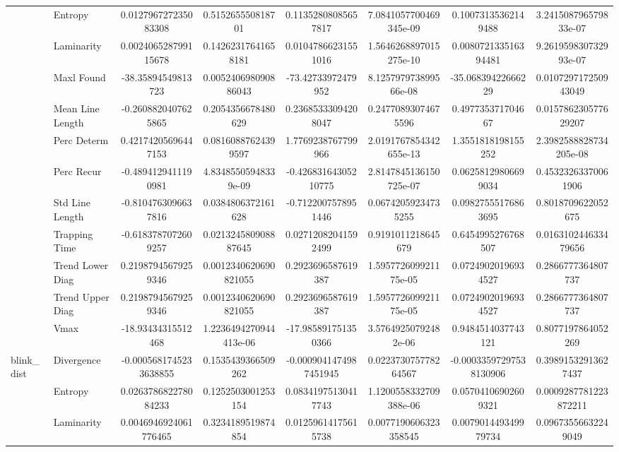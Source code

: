 \begin{tabular}{llcc|cc|cc}
 & Entropy & 0.012796727235083308 & 0.515265550818701 & 0.11352808085657817 & 7.0841057700469345e-09 & 0.10073135362149488 & 3.241508796579833e-07 \\
 & Laminarity & 0.002406528799115678 & 0.14262317641658181 & 0.01047866231551016 & 1.5646268897015275e-10 & 0.008072133516394481 & 9.261959830732993e-07 \\
 & Maxl Found & -38.35894549813723 & 0.005240698090886043 & -73.42733972479952 & 8.125797973899566e-08 & -35.06839422666229 & 0.010729717250943049 \\
 & Mean Line Length & -0.2608820407625865 & 0.2054356678480629 & 0.23685333094208047 & 0.24770893074675596 & 0.497735371704667 & 0.015786230577629207 \\
 & Perc Determ & 0.42174205696447153 & 0.08160887624399597 & 1.7769238767799966 & 2.0191767854342655e-13 & 1.3551818198155252 & 2.3982588828734205e-08 \\
 & Perc Recur & -0.4894129411190981 & 4.83485505948339e-09 & -0.42683164305210775 & 2.8147845136150725e-07 & 0.06258129806699034 & 0.45323263370061906 \\
 & Std Line Length & -0.8104763096637816 & 0.0384806372161628 & -0.7122007578951446 & 0.06742059234735255 & 0.09827555176863695 & 0.8018709622052675 \\
 & Trapping Time & -0.6183787072609257 & 0.021324580908887645 & 0.02712082041592499 & 0.9191011218645679 & 0.6454995276768507 & 0.016310244633479656 \\
 & Trend Lower Diag & 0.21987945679259346 & 0.0012340620690821055 & 0.2923696587619387 & 1.595772609921175e-05 & 0.07249020196934527 & 0.2866777364807737 \\
 & Trend Upper Diag & 0.21987945679259346 & 0.0012340620690821055 & 0.2923696587619387 & 1.595772609921175e-05 & 0.07249020196934527 & 0.2866777364807737 \\
 & Vmax & -18.93434315512468 & 1.2236494270944413e-06 & -17.985891751350366 & 3.57649250792482e-06 & 0.9484514037743121 & 0.8077197864052269 \\
\midrule
\multirow{12}{*}{blink_dist} & Divergence & -0.0005681745233638855 & 0.1535439366509262 & -0.0009041474987451945 & 0.022373075778264567 & -0.00033597297538130906 & 0.39891532913627437 \\
 & Entropy & 0.026378682278084233 & 0.1252503001253154 & 0.08341975130417743 & 1.1200558332709388e-06 & 0.05704106902609321 & 0.0009287781223872211 \\
 & Laminarity & 0.0046946924061776465 & 0.3234189519874854 & 0.01259614175615738 & 0.0077190606323358545 & 0.007901449349979734 & 0.09673556632249049 \\

\end{tabular}
